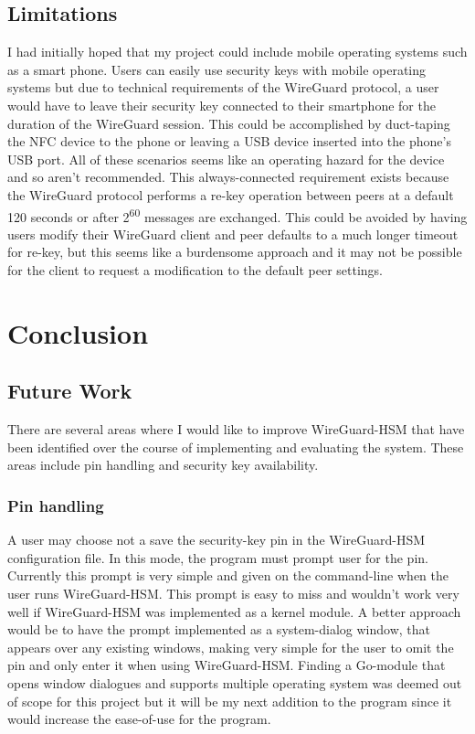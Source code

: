\documentclass [11pt, proquest] {uwthesis}[2020/02/24]
\begin{document}
\section {Limitations}
I had initially hoped that my project could include mobile operating systems such as a smart phone. Users can easily use security keys
with mobile operating systems but due to technical requirements of the WireGuard protocol, a user would have to leave their security key connected
to their smartphone for the duration of the WireGuard session. This could be accomplished by duct-taping the NFC device to the phone or leaving a USB device inserted into the phone's USB port. All of these scenarios seems like an operating hazard for the device and so aren't recommended. This always-connected requirement exists because the WireGuard protocol performs a re-key operation between peers at a default 120 seconds 
or after 2\textsuperscript{60} messages are exchanged. This could be avoided by having users modify their WireGuard client and peer defaults to a much longer timeout for re-key, but this seems like a burdensome approach and it may not be possible for the client to request a modification to the default peer settings.

\chapter {Conclusion}

\section {Future Work}
There are several areas where I would like to improve WireGuard-HSM that have been identified over the course of implementing and evaluating the system. These areas include pin handling and security key availability. 

\subsection{Pin handling}
 A user may choose not a save the security-key pin in the WireGuard-HSM configuration file. In this mode, the program must prompt user for the pin. Currently this prompt is very simple and given on the command-line when the user runs WireGuard-HSM. This prompt is easy to miss and wouldn't work very well if WireGuard-HSM was implemented as a kernel module. A better approach would be to have the prompt implemented as a system-dialog window, that appears over any existing windows, making very simple for the user to omit the pin and only enter it when using WireGuard-HSM. Finding a Go-module that opens window dialogues and supports multiple operating system was deemed out of scope for this project but it will be my next addition to the program since it would increase the ease-of-use for the program. 
 
\end{document}
